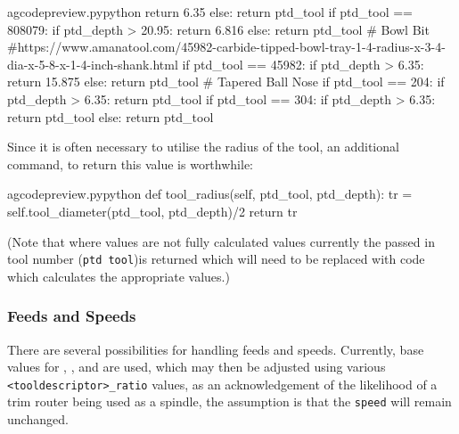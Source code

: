 \documentclass{ltxdoc}
\begin{document}
\begin{writecode}{a}{gcodepreview.py}{python}
                return 6.35
            else:
                return ptd_tool
        if ptd_tool == 808079:
            if ptd_depth > 20.95:
                return 6.816
            else:
                return ptd_tool
# Bowl Bit
#https://www.amanatool.com/45982-carbide-tipped-bowl-tray-1-4-radius-x-3-4-dia-x-5-8-x-1-4-inch-shank.html 
        if ptd_tool == 45982:
            if ptd_depth > 6.35:
                return 15.875
            else:
                return ptd_tool
# Tapered Ball Nose
        if ptd_tool == 204:
            if ptd_depth > 6.35:
                return ptd_tool
        if ptd_tool == 304:
            if ptd_depth > 6.35:
                return ptd_tool
            else:
                return ptd_tool

\end{writecode}
\addtocounter{gcpy}{87}

Since it is often necessary to utilise the radius of the tool, an additional command,  to return this value is worthwhile:
 
\lstset{firstnumber=\thegcpy}
\begin{writecode}{a}{gcodepreview.py}{python}
    def tool_radius(self, ptd_tool, ptd_depth):
        tr = self.tool_diameter(ptd_tool, ptd_depth)/2
        return tr

\end{writecode}
\addtocounter{gcpy}{4}
 
\noindent (Note that where values are not fully calculated values currently the passed in tool number (\verb|ptd tool|)is returned which will need to be replaced with code which calculates the appropriate values.)

\subsubsection{Feeds and Speeds}

There are several possibilities for handling feeds and speeds. Currently, base values for , , and  are used, which may then be adjusted using various \verb|<tooldescriptor>_ratio| values, as an acknowledgement of the likelihood of a trim router being used as a spindle, the assumption is that the \texttt{speed} will remain unchanged.

\end{document}

